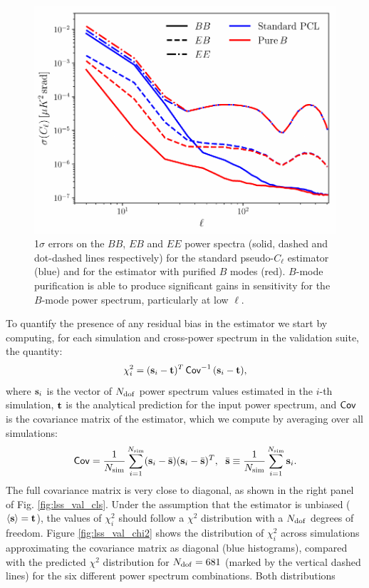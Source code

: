 \documentclass[usenatbib]{mnrasb}
\begin{document}
      \begin{figure}
        \centering
        \includegraphics[width=0.99\columnwidth]{val_sigmas_cmb_sph}
        \caption{1$\sigma$ errors on the $BB$, $EB$ and $EE$ power spectra (solid, dashed and dot-dashed lines respectively) for the standard pseudo-$C_\ell$ estimator (blue) and for the estimator with purified $B$ modes (red). $B$-mode purification is able to produce significant gains in sensitivity for the $B$-mode power spectrum, particularly at low $\ell$.}\label{fig:cmb_val_sigma}
      \end{figure}
      To quantify the presence of any residual bias in the estimator we start by computing, for each simulation and cross-power spectrum in the validation suite, the quantity:
      \begin{equation}
        \chi^2_i=({\bf s}_i-{\bf t})^T\,{\sf Cov}^{-1}\,({\bf s}_i-{\bf t}),
      \end{equation}
      where ${\bf s}_i$ is the vector of $N_{\rm dof}$ power spectrum values estimated in the $i$-th simulation, ${\bf t}$ is the analytical prediction for the input power spectrum, and ${\sf Cov}$ is the covariance matrix of the estimator, which we compute by averaging over all simulations:
      \begin{equation}
        {\sf Cov}=\frac{1}{N_{\rm sim}}\sum_{i=1}^{N_{\rm sim}}({\bf s}_i-\bar{\bf s})({\bf s}_i-\bar{\bf s})^T,\hspace{6pt} \bar{\bf s}\equiv\frac{1}{N_{\rm sim}}\sum_{i=1}^{N_{\rm sim}}{\bf s}_i.
      \end{equation}
      The full covariance matrix is very close to diagonal, as shown in the right panel of Fig. \ref{fig:lss_val_cls}. Under the assumption that the estimator is unbiased ($\langle{\bf s}\rangle={\bf t}$), the values of $\chi^2_i$ should follow a $\chi^2$ distribution with a $N_{\rm dof}$ degrees of freedom. Figure \ref{fig:lss_val_chi2} shows the distribution of $\chi^2_i$ across simulations approximating the covariance matrix as diagonal (blue histograms), compared with the predicted $\chi^2$ distribution for $N_{\rm dof}=681$ (marked by the vertical dashed lines) for the six different power spectrum combinations. Both distributions
\end{document}
